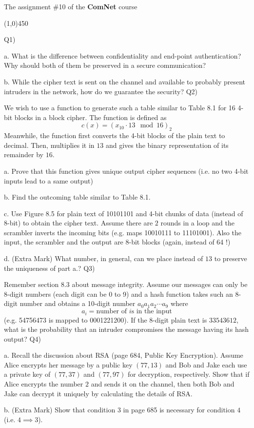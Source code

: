 \documentclass[10pt,letterpaper]{article}
\newcommand{\hl}{
\begin{center}
\line(1,0){450}
\end{center}}
\begin{document}
\Large
\begin{center}
The assignment \#10 of the \textbf{ComNet} course
\hl
\end{center}
Q1) 

a. What is the difference between confidentiality and end-point authentication? Why should both of them be preserved in a secure communication?

b. While the cipher text is sent on the channel and available to probably present intruders in the network, how do we guarantee the security?
\newline\newline
Q2)

We wish to use a function to generate such a table similar to Table 8.1 for 16 4-bit blocks in a block cipher. The function is defined as $$c(x)=(x_{10}\cdot 13\mod 16)_2$$Meanwhile, the function first converts the 4-bit blocks of the plain text to decimal. Then, multiplies it in $13$ and gives the binary representation of its remainder by $16$.

a. Prove that this function gives unique output cipher sequences (i.e. no two 4-bit inputs lead to a same output)

b. Find the outcoming table similar to Table 8.1.

c. Use Figure 8.5 for plain text of 10101101 and 4-bit chunks of data (instead of 8-bit) to obtain the cipher text. Assume there are $2$ rounds in a loop and the scrambler inverts the incoming bits (e.g. maps 10010111 to 11101001). Also the input, the scrambler and the output are 8-bit blocks (again, instead of 64 !)

d. (Extra Mark) What number, in general, can we place instead of $13$ to preserve the uniqueness of part a.?
\newline\newline
Q3)

Remember section 8.3 about message integrity. Assume our messages can only be 8-digit numbers (each digit can be 0 to 9) and a hash function takes such an 8-digit number and obtains a 10-digit number $a_0a_1a_2\cdots a_9$ where $$a_i=\text{number of }i\text{s in the input}$$
(e.g. 54756473 is mapped to 0001221200). If the 8-digit plain text is $33543612$, what is the probability that an intruder compromises the message having its hash output?
\newline\newline
Q4) 

a. Recall the discussion about RSA (page 684, Public Key Encryption). Assume Alice encrypts her message by a public key $(77,13)$ and Bob and Jake each use a private key of $(77,37)$ and $(77,97)$ for decryption, respectively. Show that if Alice encrypts the number $2$ and sends it on the channel, then both Bob and Jake can decrypt it uniquely by calculating the details of RSA.

b. (Extra Mark) Show that condition 3 in page 685 is necessary for condition $4$ (i.e. $4\implies 3$).
\end{document}
